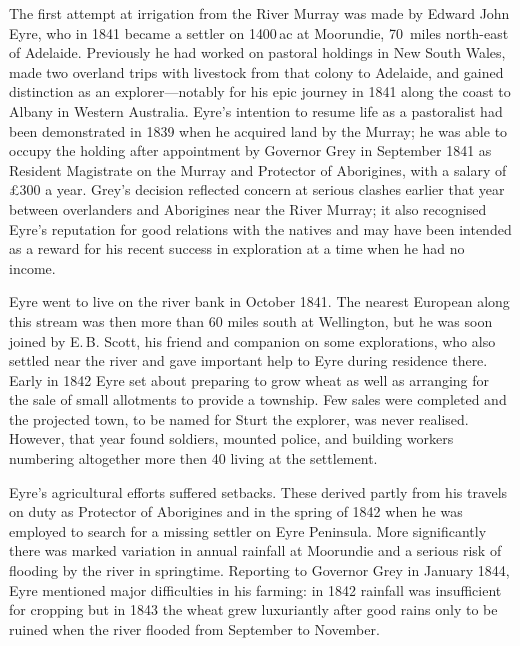 The first attempt at irrigation from the River Murray was made by
Edward John Eyre, who in 1841 became a settler on 1400\,ac at
Moorundie, 70~miles north-east of Adelaide.  Previously he had worked
on pastoral holdings in New South Wales, made two overland trips with
livestock from that colony to Adelaide, and gained distinction as an
explorer---notably for his epic journey in 1841 along the coast to
Albany in Western Australia.  Eyre's intention to resume life as a
pastoralist had been demonstrated in 1839 when he acquired land by the
Murray; he was able to occupy the holding after appointment by
Governor Grey in September 1841 as Resident Magistrate on the Murray
and Protector of Aborigines, with a salary of \pounds300 a year.
Grey's decision reflected concern at serious clashes earlier that year
between overlanders and Aborigines near the River Murray; it also
recognised Eyre's reputation for good relations with the natives and
may have been intended as a reward for his recent success in
exploration at a time when he had no income.

Eyre went to live on the river bank in October 1841. The nearest
European along this stream was then more than 60 miles south at
Wellington, but he was soon joined by E.\,B. Scott, his friend and
companion on some explorations, who also settled near the river and
gave important help to Eyre during residence there.  Early in 1842
Eyre set about preparing to grow wheat as well as arranging for the
sale of small allotments to provide a township.  Few sales were
completed and the projected town, to be named for Sturt the explorer,
was never realised.  However, that year found soldiers, mounted
police, and building workers numbering altogether more then 40 living
at the settlement.

Eyre's agricultural efforts suffered setbacks.  These derived partly
from his travels on duty as Protector of Aborigines and in the spring
of 1842 when he was employed to search for a missing settler on Eyre
Peninsula.  More significantly there was marked variation in annual
rainfall at Moorundie and a serious risk of flooding by the river in
springtime.  Reporting to Governor Grey in January 1844, Eyre
mentioned major difficulties in his farming: in 1842 rainfall was
insufficient for cropping but in 1843 the wheat grew luxuriantly after
good rains only to be ruined when the river flooded from September to
November.

